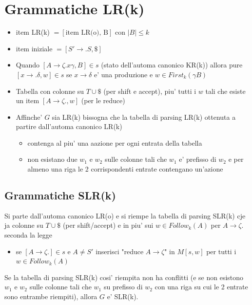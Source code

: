 \documentclass[a4paper,12pt]{article}
\begin{document}
{\section{Grammatiche LR(k)}
\begin{itemize}
  \item item LR(k) $= [\text{item LR(o), B}]$ con $\mid B \mid \leq k$
  \item item iniziale $= [S' \to .S, \mathdollar]$
  \item Quando $[A \to \zeta . x \gamma, B] \in s$ (stato dell'automa canonico KR(k)) allora pure $[x \to . \delta, w] \in s$ se $x \to \delta$ e' una produzione e $w \in First_k(\gamma B)$
  \item Tabella con colonne su $T \cup \mathdollar$ (per shift e accept), piu' tutti i $w$ tali che esiste un item $[A \to \zeta . , w]$ (per le reduce)
  \item Affinche' $G$ sia LR(k) bissogna che la tabella di parsing LR(k) ottenuta a partire dall'automa canonico LR(k)
  \begin{itemize}
    \item contenga al piu' una aazione per ogni entrata della tabella
    \item non esistano due $w_1$ e $w_2$ sulle colonne tali che $w_1$ e' prefisso di $w_2$ e per almeno una riga le 2 corrispondenti entrate contengano un'azione
  \end{itemize}
\end{itemize}
\vspace{1em}
\subsection{Grammatiche SLR(k)}
Si parte dall'automa canonico LR(o) e si riempe la tabella di parsing SLR(k) cje ja colonne su $T \cup \mathdollar$ (per shift/accept) e in piu' sui $w \in Follow_k (A)$ per $A \to \zeta .$ seconda la legge
\begin{itemize}
  \item se $[A \to \zeta.] \in s$ e $A \neq S'$ inserisci "reduce $A \to \zeta$" in $M[s, w]$ per tutti i $w \in Follow_k (A)$
\end{itemize}
Se la tabella di parsing SLR(k) cosi' riempita non ha conflitti (e se non esistono $w_1$ e $w_2$ sulle colonne tali che $w_1$ su prefisso di $w_2$ con una riga su cui le 2 entrate sono entrambe riempiti), allora $G$ e' SLR(k). \\
\vspace{1em} \\
}
\end{document}
